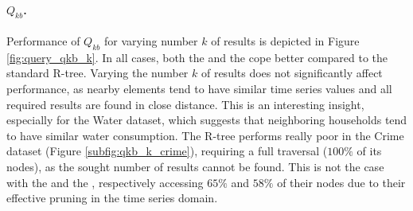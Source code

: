 \paragraph{$Q_{kb}$.} Performance of $Q_{kb}$ for varying number $k$ of results is depicted in Figure \ref{fig:query_qkb_k}.  In all cases, both the \tsr and the \btsr cope better compared to the standard R-tree. Varying the number $k$  of results does not significantly affect performance, as nearby elements tend to have similar time series values and all required results are found in close distance. This is an interesting insight, especially for the Water dataset, which suggests that neighboring households tend to have similar water consumption. The R-tree performs really poor in the Crime dataset (Figure \ref{subfig:qkb_k_crime}), requiring a full traversal ($100\%$ of its nodes), as the sought number of results cannot be found. This is not the case with the \tsr and the \btsr, respectively accessing $65\%$ and $58\%$ of their nodes due to their effective pruning in the time series domain.

